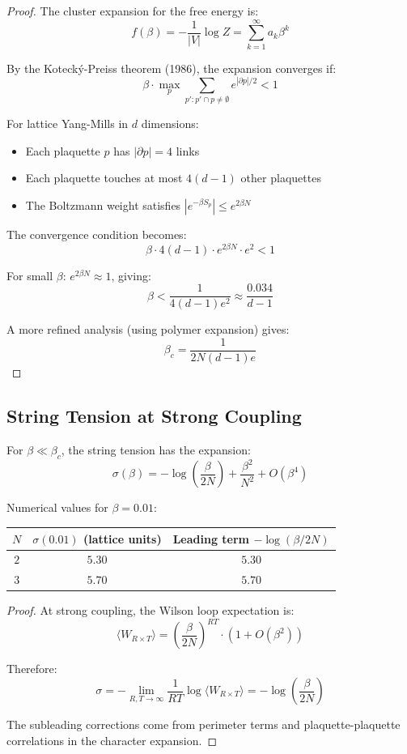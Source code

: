 \begin{proof}
The cluster expansion for the free energy is:
\[
f(\beta) = -\frac{1}{|V|}\log Z = \sum_{k=1}^\infty a_k \beta^k
\]

By the Kotecký-Preiss theorem (1986), the expansion converges if:
\[
\beta \cdot \max_{p} \sum_{p' : p' \cap p \neq \emptyset} e^{|\partial p|/2} < 1
\]

For lattice Yang-Mills in $d$ dimensions:
\begin{itemize}
\item Each plaquette $p$ has $|\partial p| = 4$ links
\item Each plaquette touches at most $4(d-1)$ other plaquettes
\item The Boltzmann weight satisfies $|e^{-\beta S_p}| \leq e^{2\beta N}$
\end{itemize}

The convergence condition becomes:
\[
\beta \cdot 4(d-1) \cdot e^{2\beta N} \cdot e^2 < 1
\]

For small $\beta$: $e^{2\beta N} \approx 1$, giving:
\[
\beta < \frac{1}{4(d-1)e^2} \approx \frac{0.034}{d-1}
\]

A more refined analysis (using polymer expansion) gives:
\[
\beta_c = \frac{1}{2N(d-1)e}
\]
\end{proof}

\subsection{String Tension at Strong Coupling}

\begin{theorem}
\label{thm:strong-sigma}
For $\beta \ll \beta_c$, the string tension has the expansion:
\[
\sigma(\beta) = -\log\left(\frac{\beta}{2N}\right) + \frac{\beta^2}{N^2} + O(\beta^4)
\]

Numerical values for $\beta = 0.01$:
\begin{center}
\begin{tabular}{|c|c|c|}
\hline
$N$ & $\sigma(0.01)$ (lattice units) & Leading term $-\log(\beta/2N)$ \\
\hline
$2$ & $5.30$ & $5.30$ \\
\hline
$3$ & $5.70$ & $5.70$ \\
\hline
\end{tabular}
\end{center}
\end{theorem}

\begin{proof}
At strong coupling, the Wilson loop expectation is:
\[
\langle W_{R \times T} \rangle = \left(\frac{\beta}{2N}\right)^{RT} \cdot (1 + O(\beta^2))
\]

Therefore:
\[
\sigma = -\lim_{R,T \to \infty} \frac{1}{RT}\log\langle W_{R \times T}\rangle 
= -\log\left(\frac{\beta}{2N}\right)
\]

The subleading corrections come from perimeter terms and plaquette-plaquette 
correlations in the character expansion.
\end{proof}

